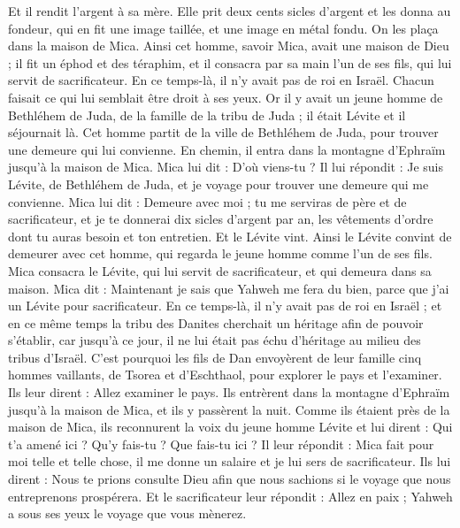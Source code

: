 \begin{multicols}{2}
Et il rendit l'argent à sa mère. Elle prit deux cents sicles d'argent et les donna au fondeur, qui en fit une image taillée, et une image en métal fondu. On les plaça dans la maison de Mica.
Ainsi cet homme, savoir Mica, avait une maison de Dieu ; il fit un éphod et des téraphim, et il consacra par sa main l'un de ses fils, qui lui servit de sacrificateur.
En ce temps-là, il n'y avait pas de roi en Israël. Chacun faisait ce qui lui semblait être droit à ses yeux.
Or il y avait un jeune homme de Bethléhem de Juda, de la famille de la tribu de Juda ; il était Lévite et il séjournait là.
Cet homme partit de la ville de Bethléhem de Juda, pour trouver une demeure qui lui convienne. En chemin, il entra dans la montagne d'Ephraïm jusqu'à la maison de Mica.
Mica lui dit : D'où viens-tu ? Il lui répondit : Je suis Lévite, de Bethléhem de Juda, et je voyage pour trouver une demeure qui me convienne.
Mica lui dit : Demeure avec moi ; tu me serviras de père et de sacrificateur, et je te donnerai dix sicles d'argent par an, les vêtements d'ordre dont tu auras besoin et ton entretien. Et le Lévite vint.
Ainsi le Lévite convint de demeurer avec cet homme, qui regarda le jeune homme comme l'un de ses fils.
Mica consacra le Lévite, qui lui servit de sacrificateur, et qui demeura dans sa maison.
Mica dit : Maintenant je sais que Yahweh me fera du bien, parce que j'ai un Lévite pour sacrificateur.
\VerseOne{}En ce temps-là, il n'y avait pas de roi en Israël ; et en ce même temps la tribu des Danites cherchait un héritage afin de pouvoir s'établir, car jusqu'à ce jour, il ne lui était pas échu d'héritage au milieu des tribus d'Israël.
C'est pourquoi les fils de Dan envoyèrent de leur famille cinq hommes vaillants, de Tsorea et d'Eschthaol, pour explorer le pays et l'examiner. Ils leur dirent : Allez examiner le pays. Ils entrèrent dans la montagne d'Ephraïm jusqu'à la maison de Mica, et ils y passèrent la nuit.
Comme ils étaient près de la maison de Mica, ils reconnurent la voix du jeune homme Lévite et lui dirent : Qui t'a amené ici ? Qu'y fais-tu ? Que fais-tu ici ?
Il leur répondit : Mica fait pour moi telle et telle chose, il me donne un salaire et je lui sers de sacrificateur.
Ils lui dirent : Nous te prions consulte Dieu afin que nous sachions si le voyage que nous entreprenons prospérera.
Et le sacrificateur leur répondit : Allez en paix ; Yahweh a sous ses yeux le voyage que vous mènerez.

\end{multicols}
